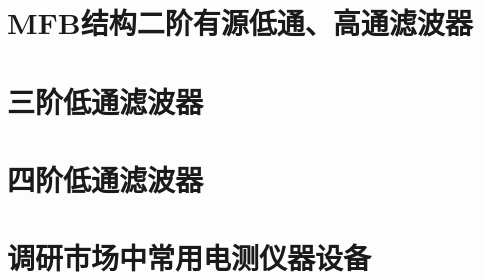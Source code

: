 \documentclass{ctexart}
\begin{document}
	\newpage
	\section{MFB结构二阶有源低通、高通滤波器}
		

	\newpage
	\section{三阶低通滤波器}
			

	\newpage
	\section{四阶低通滤波器}
			

	\newpage
	\section{调研市场中常用电测仪器设备}
			
\end{document}
